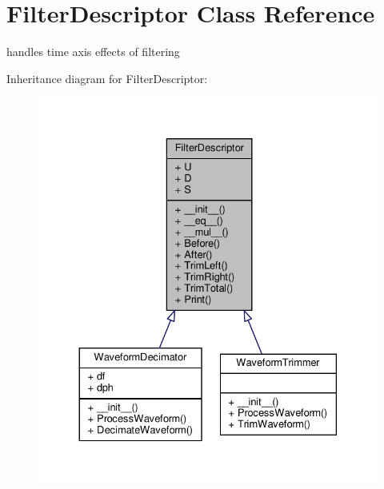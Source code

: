 \hypertarget{classSignalIntegrity_1_1TimeDomain_1_1Filters_1_1FilterDescriptor_1_1FilterDescriptor}{}\section{Filter\+Descriptor Class Reference}
\label{classSignalIntegrity_1_1TimeDomain_1_1Filters_1_1FilterDescriptor_1_1FilterDescriptor}


handles time axis effects of filtering  




Inheritance diagram for Filter\+Descriptor\+:\nopagebreak
\begin{figure}[H]
\begin{center}
\leavevmode
\includegraphics[width=330pt]{classSignalIntegrity_1_1TimeDomain_1_1Filters_1_1FilterDescriptor_1_1FilterDescriptor__inherit__graph}
\end{center}
\end{figure}



